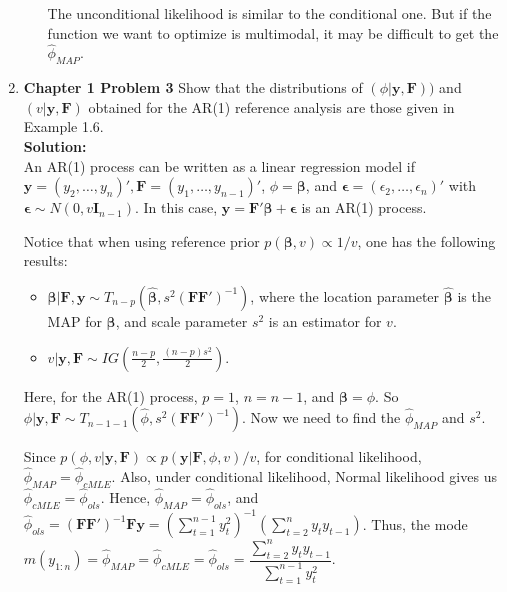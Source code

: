 \documentclass[12pt]{article}\usepackage[]{graphicx}\usepackage[]{color}
\newcommand{\bsbeta}{\boldsymbol{\beta}}
\newcommand{\bfy}{\mathbf{y}}
\newcommand{\bfF}{\mathbf{F}}
\begin{document}
\begin{enumerate}
\begin{enumerate}
	The unconditional likelihood is similar to the conditional one. But if the function we want to optimize is multimodal, it may be difficult to get the $\hat{\phi}_{MAP}$.
\end{enumerate}
	\item \textbf{Chapter 1 Problem 3} Show that the distributions of $(\phi| \bfy, \bfF))$ and $(v|\bfy, \bfF)$ obtained for the AR(1) reference analysis are those given in Example 1.6.\\
	\textbf{Solution:}\\
	An AR(1) process can be written as a linear regression model if $\bfy = (y_2, \dots, y_n)', \bfF = (y_1, \dots, y_{n-1})'$, $\phi = \bsbeta$, and $\boldsymbol{\epsilon} = (\epsilon _2, \dots, \epsilon _n)'$ with $\boldsymbol{\epsilon} \sim N(0, v\mathbf{I}_{n-1})$. In this case, $\bfy = \bfF'\bsbeta+\boldsymbol{\epsilon}$ is an AR(1) process.
	
	Notice that when using reference prior $p(\bsbeta, v) \propto 1/v$, one has the following results:
	\begin{itemize}
		\item $\bsbeta|\mathbf{F, y} \sim T_{n-p} (\boldsymbol{\hat{\beta}}, s^2(\mathbf{FF'})^{-1})$, where the location parameter $\boldsymbol{\hat{\beta}}$ is the MAP for $\bsbeta$, and scale parameter $s^2$ is an estimator for $v$.
		\item $v|\mathbf{y, F} \sim IG\left( \frac{n-p}{2}, \frac{(n-p)s^2}{2} \right).$
	\end{itemize}
	
	Here, for the AR(1) process, $p = 1$, $n = n-1$, and $\bsbeta = \phi$. So $\phi|\bfy, \bfF \sim T_{n-1-1} (\hat{\phi}, s^2(\mathbf{FF'})^{-1})$. Now we need to find the $\hat{\phi}_{MAP}$ and $s^2$.
	
	Since $p(\phi, v|\bfy, \bfF) \propto p(\bfy|\bfF, \phi, v)/v$, for conditional likelihood, $\hat{\phi}_{MAP} = \hat{\phi}_{cMLE}$. Also, under conditional likelihood, Normal likelihood gives us $\hat{\phi}_{cMLE} = \hat{\phi}_{ols}$. Hence, $\hat{\phi}_{MAP} = \hat{\phi}_{ols}$, and $\hat{\phi}_{ols} = (\mathbf{FF'})^{-1}\mathbf{Fy} = \left( \sum_{t = 1}^{n-1} y_t^2 \right)^{-1} \left( \sum_{t=2}^n y_ty_{t-1}\right)$. Thus, the mode $m(y_{1:n}) = \hat{\phi}_{MAP} = \hat{\phi}_{cMLE} = \hat{\phi}_{ols} = \dfrac{ \sum_{t=2}^n y_ty_{t-1}}{\sum_{t = 1}^{n-1} y_t^2}$.
	

\end{enumerate}
\end{document}
